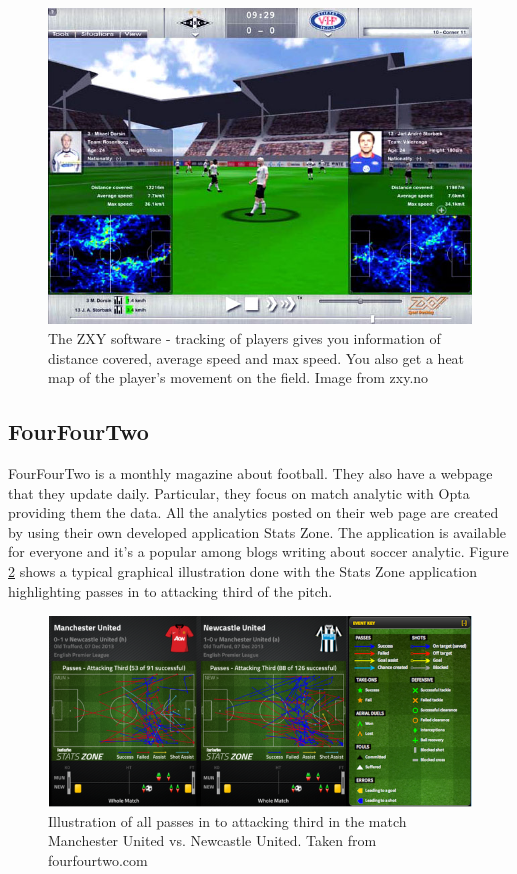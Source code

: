 \begin{figure}[ht!]
\centering
\includegraphics[width=1\textwidth]{images/general/zxysoftware.png}
\caption{The ZXY software - tracking of players gives you information of distance covered, average speed and max speed. You also get a heat map of the player’s movement on the field. Image from zxy.no}
\label{fig:zxysoftware}
\end{figure}

\subsection{FourFourTwo}

FourFourTwo is a monthly magazine about football. They also have a webpage that they update daily. Particular, they focus on match analytic with Opta providing them the data. All the analytics posted on their web page are created by using their own developed application Stats Zone. The application is available for everyone and it’s a popular among blogs writing about soccer analytic. Figure \ref{fig:fourfourtwo} shows a typical graphical illustration done with the Stats Zone application highlighting passes in to attacking third of the pitch. 

\begin{figure}[ht!]
\centering
\includegraphics[width=1\textwidth]{images/general/fourfourtwo.png}
\caption{Illustration of all passes in to attacking third in the match Manchester United vs. Newcastle United. Taken from fourfourtwo.com}
\label{fig:fourfourtwo}
\end{figure}



